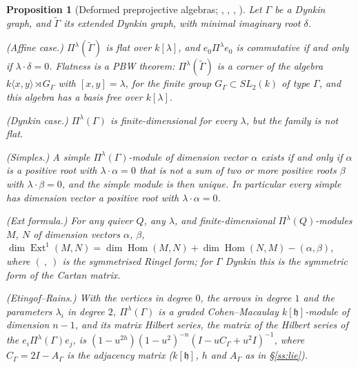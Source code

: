 \documentclass[11pt]{amsart}
\numberwithin{table}{section}
\numberwithin{figure}{section}
\numberwithin{equation}{section}
\newtheorem{prop}[thm]{Proposition}
\theoremstyle{definition}
\theoremstyle{plain}
\newcommand{\h}{\mathfrak{h}}
\newcommand{\tGamma}{\widetilde{\Gamma}}
\DeclareMathOperator{\Hom}{Hom}
\DeclareMathOperator{\Ext}{Ext}
\begin{document}
\begin{prop}[{Deformed preprojective algebras; \cite[Thms~0.1, 0.4, Lemma~1.1, Thm~3.4, Cor~3.6]{CBH}, \cite[\S1, Thm~1.2]{CB}, \cite[Prop~2.6]{CBK}, \cite[\S\S2.1, 2.3, Thm~3.1]{ER}}]\label{prop:dpa}
Let $\Gamma$ be a Dynkin graph, and $\tGamma$ its extended Dynkin graph, with minimal imaginary root $\delta$.
\begin{thmlist}
\item (Affine case.) $\Pi^\lambda(\tGamma)$ is flat over $k[\lambda]$, and $e_0\Pi^\lambda e_0$ is commutative if and only if $\lambda\cdot\delta = 0$. Flatness is a PBW theorem: $\Pi^\lambda(\tGamma)$ is a corner of the algebra $k\langle x, y\rangle \rtimes G_\Gamma$ with $[x, y] = \lambda$, for the finite group $G_\Gamma \subset SL_2(k)$ of type $\Gamma$, and this algebra has a basis free over $k[\lambda]$.
\item (Dynkin case.) $\Pi^\lambda(\Gamma)$ is finite-dimensional for every $\lambda$, but the family is not flat.
\item (Simples.) A simple $\Pi^\lambda(\Gamma)$-module of dimension vector $\alpha$ exists if and only if $\alpha$ is a positive root with $\lambda\cdot\alpha = 0$ that is not a sum of two or more positive roots $\beta$ with $\lambda\cdot\beta = 0$, and the simple module is then unique. In particular every simple has dimension vector a positive root with $\lambda\cdot\alpha = 0$.
\item (Ext formula.) For any quiver $Q$, any $\lambda$, and finite-dimensional $\Pi^\lambda(Q)$-modules $M$, $N$ of dimension vectors $\alpha$, $\beta$, $\dim \Ext^1(M, N) = \dim \Hom(M, N) + \dim \Hom(N, M) - (\alpha, \beta)$, where $(\ ,\ )$ is the symmetrised Ringel form; for $\Gamma$ Dynkin this is the symmetric form of the Cartan matrix.
\item (Etingof--Rains.) With the vertices in degree $0$, the arrows in degree $1$ and the parameters $\lambda_i$ in degree $2$, $\Pi^\lambda(\Gamma)$ is a graded Cohen--Macaulay $k[\h]$-module of dimension $n - 1$, and its matrix Hilbert series, the matrix of the Hilbert series of the $e_i\Pi^\lambda(\Gamma)e_j$, is $(1 - u^{2h})(1 - u^2)^{-n}(I - uC_\Gamma + u^2I)^{-1}$, where $C_\Gamma = 2I - A_\Gamma$ is the adjacency matrix ($k[\h]$, $h$ and $A_\Gamma$ as in \S\ref{ss:lie}).
\end{thmlist}
\end{prop}
\end{document}
